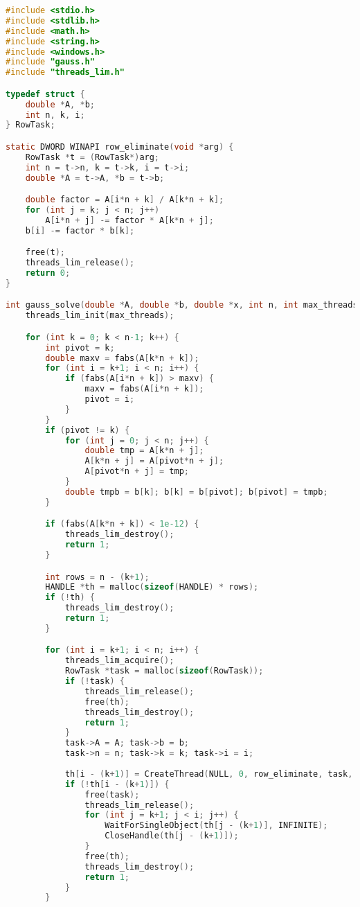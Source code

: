 \begin{lstlisting}[language=C]
#include <stdio.h>
#include <stdlib.h>
#include <math.h>
#include <string.h>
#include <windows.h>
#include "gauss.h"
#include "threads_lim.h"

typedef struct {
    double *A, *b;
    int n, k, i;
} RowTask;

static DWORD WINAPI row_eliminate(void *arg) {
    RowTask *t = (RowTask*)arg;
    int n = t->n, k = t->k, i = t->i;
    double *A = t->A, *b = t->b;

    double factor = A[i*n + k] / A[k*n + k];
    for (int j = k; j < n; j++)
        A[i*n + j] -= factor * A[k*n + j];
    b[i] -= factor * b[k];

    free(t);
    threads_lim_release();
    return 0;
}

int gauss_solve(double *A, double *b, double *x, int n, int max_threads, int verbose) {
    threads_lim_init(max_threads);

    for (int k = 0; k < n-1; k++) {
        int pivot = k;
        double maxv = fabs(A[k*n + k]);
        for (int i = k+1; i < n; i++) {
            if (fabs(A[i*n + k]) > maxv) {
                maxv = fabs(A[i*n + k]);
                pivot = i;
            }
        }
        if (pivot != k) {
            for (int j = 0; j < n; j++) {
                double tmp = A[k*n + j];
                A[k*n + j] = A[pivot*n + j];
                A[pivot*n + j] = tmp;
            }
            double tmpb = b[k]; b[k] = b[pivot]; b[pivot] = tmpb;
        }

        if (fabs(A[k*n + k]) < 1e-12) {
            threads_lim_destroy();
            return 1;
        }

        int rows = n - (k+1);
        HANDLE *th = malloc(sizeof(HANDLE) * rows);
        if (!th) {
            threads_lim_destroy();
            return 1;
        }

        for (int i = k+1; i < n; i++) {
            threads_lim_acquire();
            RowTask *task = malloc(sizeof(RowTask));
            if (!task) {
                threads_lim_release();
                free(th);
                threads_lim_destroy();
                return 1;
            }
            task->A = A; task->b = b;
            task->n = n; task->k = k; task->i = i;
            
            th[i - (k+1)] = CreateThread(NULL, 0, row_eliminate, task, 0, NULL);
            if (!th[i - (k+1)]) {
                free(task);
                threads_lim_release();
                for (int j = k+1; j < i; j++) {
                    WaitForSingleObject(th[j - (k+1)], INFINITE);
                    CloseHandle(th[j - (k+1)]);
                }
                free(th);
                threads_lim_destroy();
                return 1;
            }
        }


\end{lstlisting}
